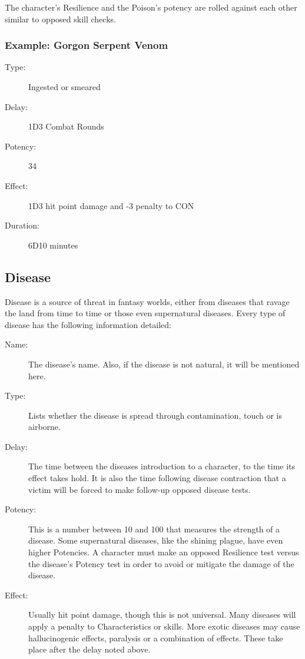 The character's Resilience and the Poison's potency are rolled against each other similar to opposed skill checks.

\subsubsection{Example: Gorgon Serpent Venom}

\begin{description}
\item[Type:] Ingested or smeared
\item[Delay:] 1D3 Combat Rounds
\item[Potency:] 34
\item[Effect:] 1D3 hit point damage and -3 penalty to CON
\item[Duration:] 6D10 minutes
\end{description}

\subsection{Disease}
Disease is a source of threat in fantasy worlds, either from diseases that ravage the land from time to time or those even supernatural diseases.
Every type of disease has the following information detailed: 

\begin{description}
	\item[Name:] The disease’s name. Also, if the disease is not natural, it will be mentioned here. 
	\item[Type:] Lists whether the disease is spread through contamination, touch or is airborne. 
	\item[Delay:] The time between the diseases introduction to a character, to the time its effect takes hold. It is also the time following disease contraction that a victim will be forced to make follow-up opposed disease tests.
	\item[Potency:] This is a number between 10 and 100 that measures the strength of a disease. Some supernatural diseases, like the shining plague, have even higher Potencies. A character must make an opposed Resilience test versus the disease’s Potency test in order to avoid or mitigate the damage of the disease.
	\item[Effect:] Usually hit point damage, though this is not universal. Many diseases will apply a penalty to Characteristics or skills. More exotic diseases may cause hallucinogenic effects, paralysis or a combination of effects. These take place after the delay noted above. 
\end{description}


